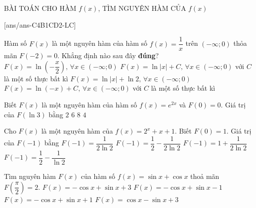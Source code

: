 \begin{dang}{BÀI TOÁN CHO HÀM $f(x)$, TÌM NGUYÊN HÀM CỦA $f(x)$}
\end{dang}
[ans/ans-C4B1CD2-LC]
\TN
\begin{ex}%
Hàm số $F(x)$ là một nguyên hàm của hàm số $f(x)=\dfrac{1}{x}$ trên $(-\infty;0)$ thỏa mãn $F(-2)=0$. Khẳng định nào sau đây \textbf{đúng}?
\choice
{\True $F(x)=\ln \left(-\dfrac{x}{2} \right),\,\forall x\in (-\infty;0)$}
{$F(x)=\ln \left|x\right|+C,\,\forall x\in (-\infty;0)$ với $C$ là một số thực bất kì}
{$F(x)=\ln \left|x\right|+\ln 2,\,\forall x\in (-\infty;0)$}
{$F(x)=\ln \left(-x\right)+C,\,\forall x\in (-\infty;0)$ với $C$ là một số thực bất kì}
\end{ex}

\begin{ex}%
Biết $F(x)$ là một nguyên hàm của hàm số $f(x)=e^{2x}$ và $F(0)=0$. Giá trị của $F(\ln 3)$ bằng
\choice
{$2$}
{$6$}
{$8$}
{\True $4$}
\end{ex}

\begin{ex}%
Cho $F(x)$ là một nguyên hàm của $f(x)=2^x+x+1$. Biết $F(0)=1$. Giá trị của $F(-1)$ bằng
\choice
{$F(-1)=\dfrac{1}{2\ln 2}$}
{\True $F(-1)=\dfrac{1}{2}-\dfrac{1}{2\ln 2}$}
{$F(-1)=1+\dfrac{1}{2\ln 2}$}
{$F(-1)=\dfrac{1}{2}-\dfrac{1}{\ln 2}$}
\end{ex}

\begin{ex}%
Tìm nguyên hàm $F(x)$ của hàm số $f(x)=\sin x+\cos x$ thoả mãn $F\left(\dfrac{\pi}{2}\right)=2$.
\choice
{$F(x)=-\cos x+\sin x+3$}
{$F(x)=-\cos x+\sin x-1$}
{\True $F(x)=-\cos x+\sin x+1$}
{$F(x)=\cos x-\sin x+3$}
\end{ex}

